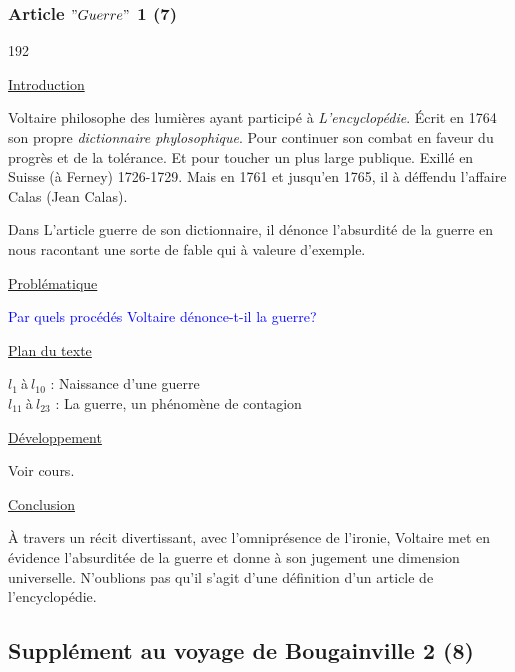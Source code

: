 \documentclass[12pt,a4paper]{article}
\begin{document}
				\subsubsection{Article $"Guerre"$ 1 (7)}

\begin{dingautolist}{192}

\item \underline{Introduction} \par
	Voltaire philosophe des lumi\`eres ayant particip\'e \`a \textit{L'encyclop\'edie}. \'Ecrit en 1764 son propre \textit{dictionnaire phylosophique}. 
	Pour continuer son combat en faveur du progr\`es et de la tol\'erance. Et pour toucher un plus large publique. Exill\'e en Suisse (\`a Ferney) 1726-1729. Mais en 1761 et jusqu'en 1765, il \`a d\'effendu l'affaire Calas (Jean Calas).\par
	Dans L'article guerre de son dictionnaire, il d\'enonce l'absurdit\'e de la guerre en nous racontant une sorte de fable qui \`a valeure d'exemple.
	
\item \underline{Probl\'ematique }\par
	\textcolor{blue}{Par quels proc\'ed\'es Voltaire d\'enonce-t-il la guerre?}

\item \underline{Plan du texte} \par
	$l_{1}~$\`a$~l_{10}$ : Naissance d'une guerre \\
	$l_{11}~$\`a$~l_{23}$ : La guerre, un ph\'enom\`ene de contagion

\item \underline{D\'eveloppement} \par
        Voir cours.

\item \underline{Conclusion} \par
	\`A travers un r\'ecit divertissant, avec l'omnipr\'esence de l'ironie, Voltaire met en \'evidence l'absurdit\'ee de la guerre et donne \`a son jugement une dimension universelle. N'oublions pas qu'il s'agit d'une d\'efinition d'un article de l'encyclop\'edie. 

\end{dingautolist}
 \newpage

				\subsection{Suppl\'ement au voyage de Bougainville 2 (8)}
\end{document}
